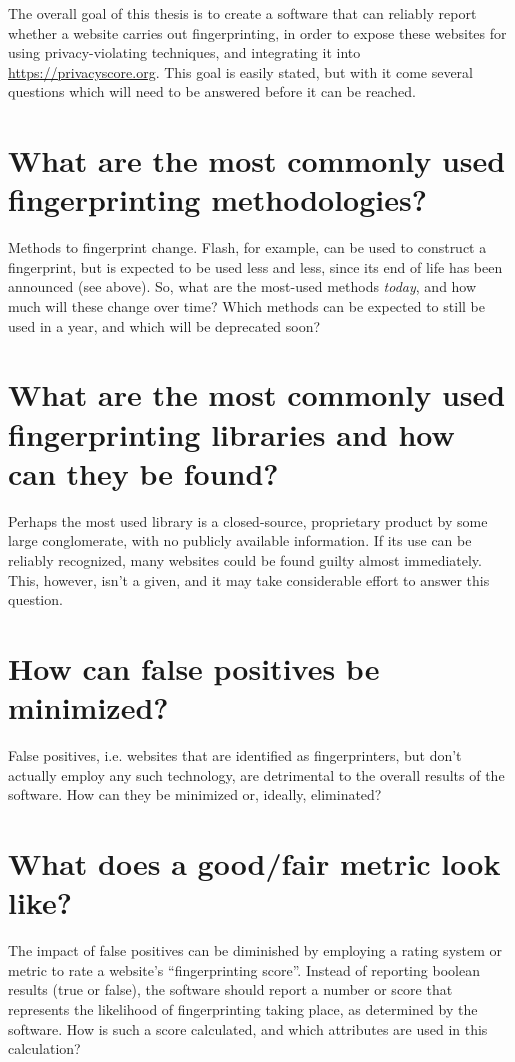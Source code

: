 \documentclass[
    fontsize=12pt,
    headings=small,
    parskip=half,
    bibliography=totoc,
    numbers=noenddot,
    open=any
    ]{scrreprt}
\begin{document}
The overall goal of this thesis is to create a software that can reliably report whether a website carries out
fingerprinting, in order to expose these websites for using privacy-violating techniques, and integrating it into
\url{https://privacyscore.org}.
This goal is easily stated, but with it come several questions which will need to be answered before
it can be reached.

\section{What are the most commonly used fingerprinting methodologies?}
Methods to fingerprint change. Flash, for example, can be used to construct a fingerprint, but is expected
to be used less and less, since its end of life has been announced (see above).
So, what are the most-used methods \textit{today}, and how much will these change over time? Which methods
can be expected to still be used in a year, and which will be deprecated soon?

\section{What are the most commonly used fingerprinting libraries and how can they be found?}
Perhaps the most used library is a closed-source, proprietary product by some large conglomerate,
with no publicly available information. If its use can be reliably recognized, many websites could be found guilty
almost immediately. This, however, isn't a given, and it may take considerable effort to answer this question.

\section{How can false positives be minimized?}
False positives, i.e. websites that are identified as fingerprinters, but don't actually employ any such technology,
are detrimental to the overall results of the software. How can they be minimized or, ideally, eliminated?

\section{What does a good/fair metric look like?}
The impact of false positives can be diminished by employing a rating system or metric to rate a website's
``fingerprinting score''. Instead of reporting boolean results (true or false), the software should
report a number or score that represents the likelihood of fingerprinting taking place, as determined by the software.
How is such a score calculated, and which attributes are used in this calculation?
\end{document}
